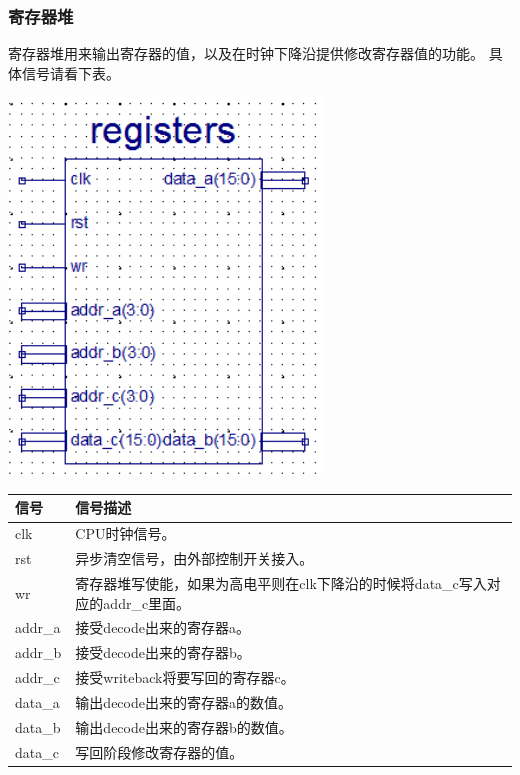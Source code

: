\subsubsection{寄存器堆}
    寄存器堆用来输出寄存器的值，以及在时钟下降沿提供修改寄存器值的功能。
    具体信号请看下表。
\begin{center}
    \includegraphics[height=10cm]{image/detail/detail_register.png}
    \label{fig:register}
\end{center}
\begin{center}
    \label{table:register}
    \begin{longtable}{p{}p{}}
        \toprule
        信号 & 信号描述 \\
        \midrule
            clk & CPU时钟信号。\\
            rst &  异步清空信号，由外部控制开关接入。\\
            wr & 寄存器堆写使能，如果为高电平则在clk下降沿的时候将data\_c写入对应的addr\_c里面。\\
            addr\_a & 接受decode出来的寄存器a。\\
            addr\_b & 接受decode出来的寄存器b。\\
            addr\_c & 接受writeback将要写回的寄存器c。\\
            data\_a & 输出decode出来的寄存器a的数值。\\
            data\_b & 输出decode出来的寄存器b的数值。\\
            data\_c & 写回阶段修改寄存器的值。\\
        \bottomrule
    \end{longtable}
\end{center}

